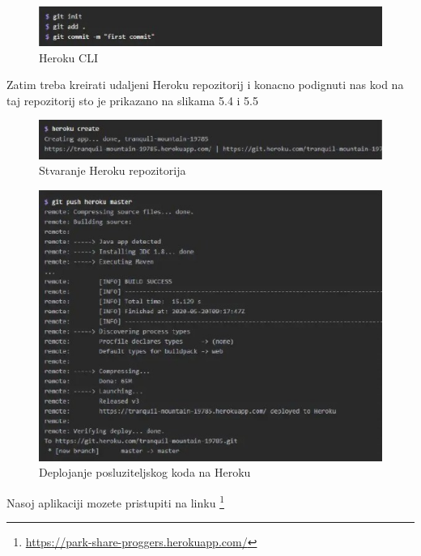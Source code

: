 		\begin{figure}[H]
		
		\includegraphics[width=\textwidth]{slike/druga.jpg} %
		\centering
		\caption{Heroku CLI}
		\label{fig:cli}
	\end{figure}
Zatim treba kreirati udaljeni Heroku repozitorij i konacno podignuti nas kod na taj repozitorij sto je prikazano na slikama 5.4 i 5.5
	\begin{figure}[H]
	
	\includegraphics[width=\textwidth]{slike/treca.jpg} %
	\centering
	\caption{Stvaranje Heroku repozitorija}
	\label{fig:tre}
\end{figure}
\begin{figure}[H]
	
	\includegraphics[width=\textwidth]{slike/cetvrta.jpg} %
	\centering
	\caption{Deplojanje posluziteljskog koda na Heroku}
	\label{fig:cli}
\end{figure}
Nasoj aplikaciji mozete pristupiti na linku \footnote{\url{https://park-share-proggers.herokuapp.com/}}
		
			\eject 